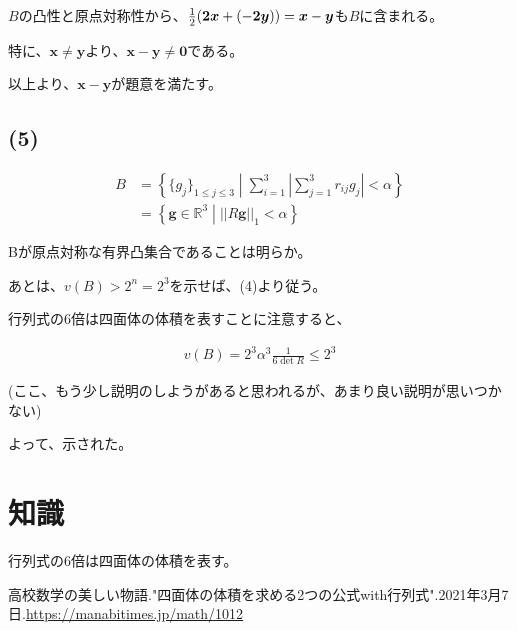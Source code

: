 \documentclass[a4paper, 10pt, dvipdfmx]{jlreq}
\begin{document}
$B$の凸性と原点対称性から、$\frac{1}{2}\qty(\bm{2x}+(-\bm{2y}))=\bm{x}-\bm{y}$も$B$に含まれる。

特に、$\bm{x} \neq \bm{y}$より、$\bm{x}-\bm{y} \neq \bm{0}$である。

以上より、$\bm{x}-\bm{y}$が題意を満たす。

\subsection*{(5)}

\begin{align*}
  B & =\left\{\{g_j\}_{1 \leq j\leq 3} \middle| \sum_{i=1}^{3} \left\lvert \sum_{j=1}^{3}r_{ij}g_j \right\rvert < \alpha \right\} \\
    & =\left\{\bm{g}\in \mathbb{R}^3 \middle| ||R\bm{g}||_1 < \alpha \right\}
\end{align*}

Bが原点対称な有界凸集合であることは明らか。

あとは、$v(B)>2^n=2^3$を示せば、(4)より従う。

行列式の6倍は四面体の体積を表すことに注意すると、

\begin{align*}
  v(B)=2^3 \alpha^3 \frac{1}{6\det R} \leq 2^3
\end{align*}

(ここ、もう少し説明のしようがあると思われるが、あまり良い説明が思いつかない)

よって、示された。

\section{知識}

行列式の6倍は四面体の体積を表す。\cite{site:1}

\begin{thebibliography}{9}
  高校数学の美しい物語."四面体の体積を求める2つの公式with行列式".2021年3月7日.\url{https://manabitimes.jp/math/1012}
\end{thebibliography}
\end{document}
